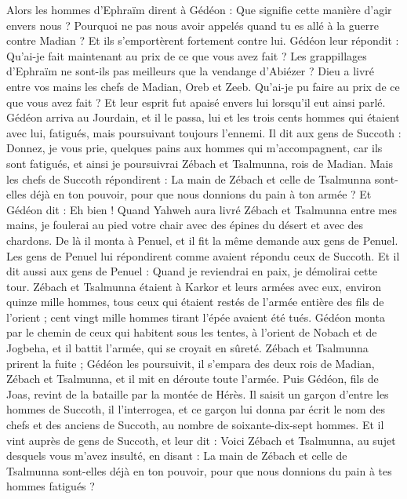 \begin{multicols}{2}
\VerseOne{}Alors les hommes d'Ephraïm dirent à Gédéon : Que signifie cette manière d’agir envers nous ? Pourquoi ne pas nous avoir appelés quand tu es allé à la guerre contre Madian ? Et ils s'emportèrent fortement contre lui.
Gédéon leur répondit : Qu'ai-je fait maintenant au prix de ce que vous avez fait ? Les grappillages d'Ephraïm ne sont-ils pas meilleurs que la vendange d'Abiézer ?
Dieu a livré entre vos mains les chefs de Madian, Oreb et Zeeb. Qu'ai-je pu faire au prix de ce que vous avez fait ? Et leur esprit fut apaisé envers lui lorsqu’il eut ainsi parlé.
Gédéon arriva au Jourdain, et il le passa, lui et les trois cents hommes qui étaient avec lui, fatigués, mais poursuivant toujours l'ennemi.
Il dit aux gens de Succoth : Donnez, je vous prie, quelques pains aux hommes qui m’accompagnent, car ils sont fatigués, et ainsi je poursuivrai Zébach et Tsalmunna, rois de Madian.
Mais les chefs de Succoth répondirent : La main de Zébach et celle de Tsalmunna sont-elles déjà en ton pouvoir, pour que nous donnions du pain à ton armée ?
Et Gédéon dit : Eh bien ! Quand Yahweh aura livré Zébach et Tsalmunna entre mes mains, je foulerai au pied votre chair avec des épines du désert et avec des chardons.
De là il monta à Penuel, et il fit la même demande aux gens de Penuel. Les gens de Penuel lui répondirent comme avaient répondu ceux de Succoth.
Et il dit aussi aux gens de Penuel : Quand je reviendrai en paix, je démolirai cette tour.
Zébach et Tsalmunna étaient à Karkor et leurs armées avec eux, environ quinze mille hommes, tous ceux qui étaient restés de l'armée entière des fils de l’orient ; cent vingt mille hommes tirant l’épée avaient été tués.
Gédéon monta par le chemin de ceux qui habitent sous les tentes, à l’orient de Nobach et de Jogbeha, et il battit l'armée, qui se croyait en sûreté.
Zébach et Tsalmunna prirent la fuite ; Gédéon les poursuivit, il s’empara des deux rois de Madian, Zébach et Tsalmunna, et il mit en déroute toute l'armée.
Puis Gédéon, fils de Joas, revint de la bataille par la montée de Hérès.
Il saisit un garçon d’entre les hommes de Succoth, il l'interrogea, et ce garçon lui donna par écrit le nom des chefs et des anciens de Succoth, au nombre de soixante-dix-sept hommes.
Et il vint auprès de gens de Succoth, et leur dit : Voici Zébach et Tsalmunna, au sujet desquels vous m'avez insulté, en disant : La main de Zébach et celle de Tsalmunna sont-elles déjà en ton pouvoir, pour que nous donnions du pain à tes hommes fatigués ?

\end{multicols}
